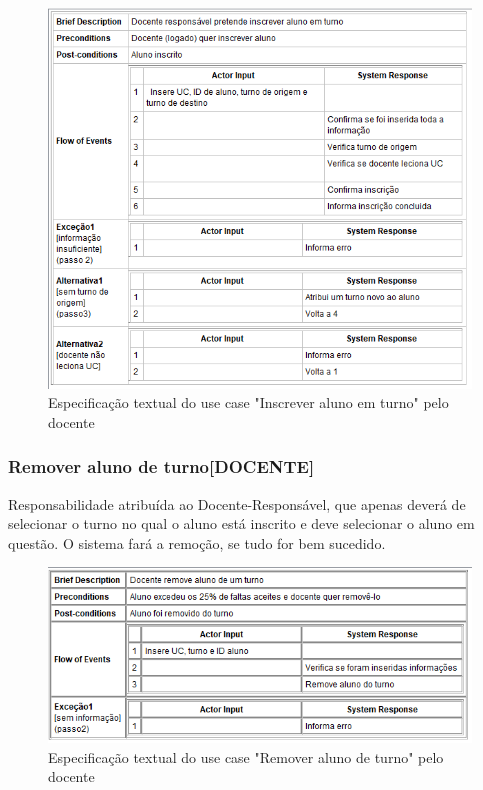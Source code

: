 \documentclass[a4paper]{article}
\begin{document}
\begin{figure}[H]
\centering
\includegraphics[width=14cm]{UCInscreverAlunoEmTurnoDOCENTE}
\caption{Especificação textual do use case "Inscrever aluno em turno" pelo docente}
\label{}
\end{figure}

\clearpage
\subsubsection{Remover aluno de turno[DOCENTE]}
\hspace{3mm}Responsabilidade atribuída ao Docente-Responsável, que apenas deverá de selecionar o turno no qual o aluno está inscrito e deve selecionar o aluno em questão. O sistema fará a remoção, se tudo for bem sucedido.

\begin{figure}[H]
\centering
\includegraphics[width=14cm]{UCRemoverAlunoDeTurnoDOCENTE}
\caption{Especificação textual do use case "Remover aluno de turno" pelo docente}
\label{}
\end{figure}
\end{document}
